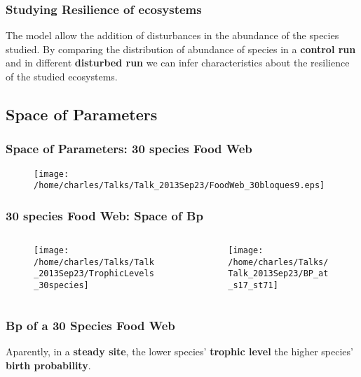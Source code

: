 \documentclass[xcolor=x11names,compress]{beamer}
\renewcommand{\(}{\begin{columns}}
\renewcommand{\)}{\end{columns}}
\newcommand{\<}[1]{\begin{column}{#1}}
\renewcommand{\>}{\end{column}}
\begin{document}
\begin{frame}
\frametitle{Studying Resilience of ecosystems}
\begin{block}{}
The model allow the addition of disturbances in the abundance of the species studied. By comparing the distribution of abundance of species in a \textbf{control run} and in different \textbf{disturbed run} we can infer characteristics about the resilience of the studied ecosystems. 
\end{block}
\end{frame}



\subsection{Space of Parameters}
\begin{frame}
\frametitle{Space of Parameters: 30 species Food Web}
\begin{figure}
  \texttt{[image: /home/charles/Talks/Talk\_2013Sep23/FoodWeb\_30bloques9.eps]}
\end{figure}
\end{frame}

\begin{frame}
\frametitle{30 species Food Web: Space of Bp}
\begin{columns}
  \begin{column}{0.5\textwidth}
   \begin{figure}
	\texttt{[image: /home/charles/Talks/Talk\_2013Sep23/TrophicLevels\_30species]}
   \end{figure}
  \end{column}

  \begin{column}{0.5\textwidth}
   \begin{figure}
	\texttt{[image: /home/charles/Talks/Talk\_2013Sep23/BP\_at\_s17\_st71]}
   \end{figure}
  \end{column}
\end{columns}
\end{frame}

\begin{frame}
\frametitle{Bp of a 30 Species Food Web}
\begin{block}{}
Aparently, in a \textbf{steady site}, the lower species' \textbf{trophic level} the higher species' \textbf{birth probability}. 
\end{block}
\end{frame}
\end{document}
